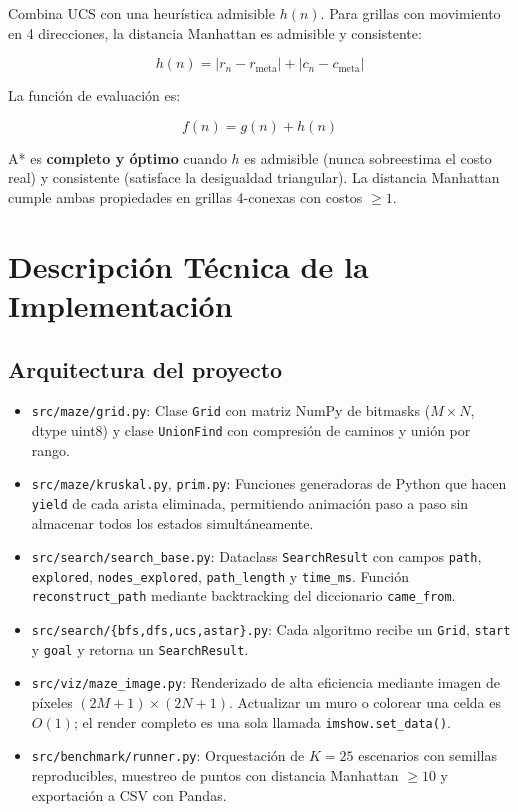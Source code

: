 \documentclass[12pt,a4paper]{article}
\begin{document}
Combina UCS con una heurística admisible $h(n)$. Para grillas con
movimiento en 4 direcciones, la distancia Manhattan es admisible y
consistente:

\[
  h(n) = |r_n - r_{\text{meta}}| + |c_n - c_{\text{meta}}|
\]

La función de evaluación es:

\[
  f(n) = g(n) + h(n)
\]

A* es \textbf{completo y óptimo} cuando $h$ es admisible (nunca
sobreestima el costo real) y consistente (satisface la desigualdad
triangular). La distancia Manhattan cumple ambas propiedades en
grillas 4-conexas con costos $\geq 1$.

\section{Descripción Técnica de la Implementación}

\subsection{Arquitectura del proyecto}

\begin{itemize}
  \item \texttt{src/maze/grid.py}: Clase \texttt{Grid} con matriz
        NumPy de bitmasks ($M\times N$, dtype uint8) y clase
        \texttt{UnionFind} con compresión de caminos y unión por rango.
  \item \texttt{src/maze/kruskal.py}, \texttt{prim.py}: Funciones
        generadoras de Python que hacen \texttt{yield} de cada arista
        eliminada, permitiendo animación paso a paso sin almacenar
        todos los estados simultáneamente.
  \item \texttt{src/search/search\_base.py}: Dataclass
        \texttt{SearchResult} con campos \texttt{path},
        \texttt{explored}, \texttt{nodes\_explored},
        \texttt{path\_length} y \texttt{time\_ms}.
        Función \texttt{reconstruct\_path} mediante backtracking
        del diccionario \texttt{came\_from}.
  \item \texttt{src/search/\{bfs,dfs,ucs,astar\}.py}: Cada algoritmo
        recibe un \texttt{Grid}, \texttt{start} y \texttt{goal} y
        retorna un \texttt{SearchResult}.
  \item \texttt{src/viz/maze\_image.py}: Renderizado de alta
        eficiencia mediante imagen de píxeles $(2M+1)\times(2N+1)$.
        Actualizar un muro o colorear una celda es $O(1)$; el render
        completo es una sola llamada \texttt{imshow.set\_data()}.
  \item \texttt{src/benchmark/runner.py}: Orquestación de $K=25$
        escenarios con semillas reproducibles, muestreo de puntos
        con distancia Manhattan $\geq 10$ y exportación a CSV con Pandas.
\end{itemize}
\end{document}

